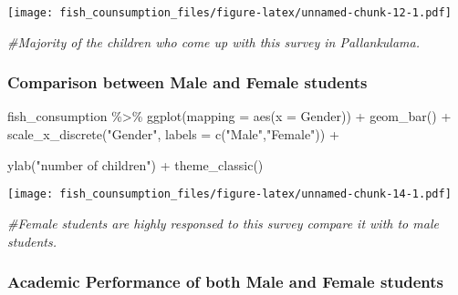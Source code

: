 \documentclass[
]{article}
\newenvironment{Shaded}{\begin{snugshade}}{\end{snugshade}}
\newcommand{\AttributeTok}[1]{\textcolor[rgb]{0.77,0.63,0.00}{#1}}
\newcommand{\CommentTok}[1]{\textcolor[rgb]{0.56,0.35,0.01}{\textit{#1}}}
\newcommand{\FunctionTok}[1]{\textcolor[rgb]{0.00,0.00,0.00}{#1}}
\newcommand{\NormalTok}[1]{#1}
\newcommand{\SpecialCharTok}[1]{\textcolor[rgb]{0.00,0.00,0.00}{#1}}
\newcommand{\StringTok}[1]{\textcolor[rgb]{0.31,0.60,0.02}{#1}}
\begin{document}
\texttt{[image: fish\_counsumption\_files/figure-latex/unnamed-chunk-12-1.pdf]}

\begin{Shaded}
\begin{Highlighting}[]
\CommentTok{\#Majority of the children who come up with this survey in Pallankulama. }
\end{Highlighting}
\end{Shaded}

\hypertarget{comparison-between-male-and-female-students}{%
\subsubsection{Comparison between Male and Female
students}\label{comparison-between-male-and-female-students}}

\begin{Shaded}
\begin{Highlighting}[]
\NormalTok{fish\_consumption }\SpecialCharTok{\%\textgreater{}\%}
\FunctionTok{ggplot}\NormalTok{(}\AttributeTok{mapping =} \FunctionTok{aes}\NormalTok{(}\AttributeTok{x =}\NormalTok{ Gender)) }\SpecialCharTok{+}
\FunctionTok{geom\_bar}\NormalTok{() }\SpecialCharTok{+}
\FunctionTok{scale\_x\_discrete}\NormalTok{(}\StringTok{"Gender"}\NormalTok{, }\AttributeTok{labels =} \FunctionTok{c}\NormalTok{(}\StringTok{"Male"}\NormalTok{,}\StringTok{"Female"}\NormalTok{)) }\SpecialCharTok{+}

\FunctionTok{ylab}\NormalTok{(}\StringTok{"number of children"}\NormalTok{) }\SpecialCharTok{+}
\FunctionTok{theme\_classic}\NormalTok{()}
\end{Highlighting}
\end{Shaded}

\texttt{[image: fish\_counsumption\_files/figure-latex/unnamed-chunk-14-1.pdf]}

\begin{Shaded}
\begin{Highlighting}[]
\CommentTok{\#Female students are highly responsed to this survey compare it with to male students. }
\end{Highlighting}
\end{Shaded}

\hypertarget{academic-performance-of-both-male-and-female-students}{%
\subsubsection{Academic Performance of both Male and Female
students}\label{academic-performance-of-both-male-and-female-students}}
\end{document}
